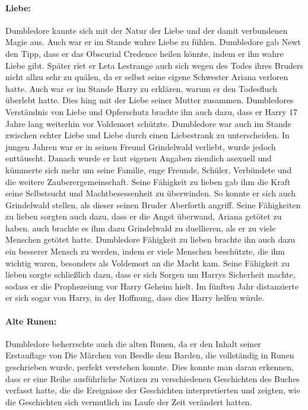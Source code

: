 \documentclass[a4paper, 10pt]{article}
\begin{document}
\paragraph{Liebe:}
Dumbledore kannte sich mit der Natur der Liebe und der damit verbundenen Magie aus. Auch war er im Stande wahre Liebe zu fühlen. Dumbledore gab Newt den Tipp, dass er das Obscurial Credence heilen könnte, indem er ihn wahre Liebe gibt. Später riet er Leta Lestrange auch sich wegen des Todes ihres Bruders nicht allzu sehr zu quälen, da er selbst seine eigene Schwester Ariana verloren hatte. Auch war er im Stande Harry zu erklären, warum er den Todesfluch überlebt hatte. Dies hing mit der Liebe seiner Mutter zusammen. Dumbledores Verständnis von Liebe und Opferschutz brachte ihn auch dazu, dass er Harry 17 Jahre lang weiterhin vor Voldemort schützte. Dumbledore war auch im Stande zwischen echter Liebe und Liebe durch einen Liebestrank zu unterscheiden. In jungen Jahren war er in seinen Freund Grindelwald verliebt, wurde jedoch enttäuscht. Danach wurde er laut eigenen Angaben ziemlich asexuell und kümmerte sich mehr um seine Familie, enge Freunde, Schüler, Verbündete und die weitere Zauberergemeinschaft. Seine Fähigkeit zu lieben gab ihm die Kraft seine Selbstsucht und Machtbesessenheit zu überwinden. So konnte er sich auch Grindelwald stellen, als dieser seinen Bruder Aberforth angriff. Seine Fähigkeiten zu lieben sorgten auch dazu, dass er die Angst überwand, Ariana getötet zu haben. auch brachte es
ihm dazu Grindelwald zu duellieren, als er zu viele Menschen getötet hatte. Dumbledore Fähigkeit zu lieben brachte ihn auch dazu ein besserer Mensch zu werden, indem er viele Menschen beschützte, die ihm wichtig waren, besonders als Voldemort an die Macht kam. Seine Fähigkeit zu lieben sorgte schließlich dazu, dass er sich Sorgen um Harrys Sicherheit machte, sodass er die Prophezeiung vor Harry Geheim hielt. Im fünften Jahr distanzierte er sich sogar von Harry, in der Hoffnung, dass dies Harry helfen würde.
\paragraph{Alte Runen:}
Dumbledore beherrschte auch die alten Runen, da er den Inhalt seiner Erstauflage von Die Märchen von Beedle dem Barden, die vollständig in Runen geschrieben wurde, perfekt verstehen konnte. Dies konnte man daran erkennen, dass er eine Reihe ausführliche Notizen zu verschiedenen Geschichten des Buches verfasst hatte, die die Ereignisse der Geschichten interpretierten und zeigten, wie die Geschichten sich vermutlich im Laufe der Zeit verändert hatten.
\end{document}
